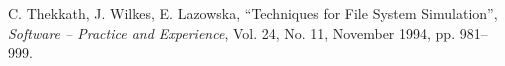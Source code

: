 \begin{thebibliography}{99}





C. Thekkath, J. Wilkes, E. Lazowska,
``Techniques for File System Simulation'',
{\it Software -- Practice and Experience},
Vol. 24, No. 11, November 1994, pp. 981--999.








\end{thebibliography}
